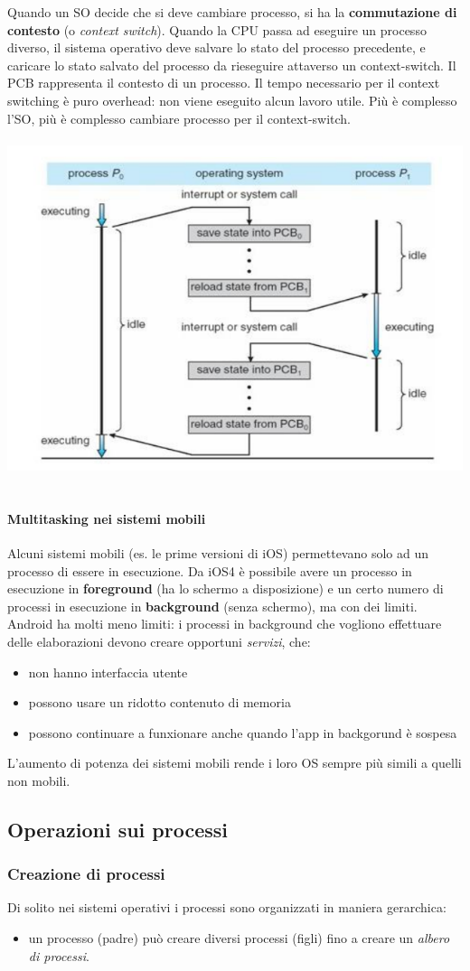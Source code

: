\documentclass[11pt]{article}
\begin{document}
Quando un SO decide che si deve cambiare processo, si ha la \textbf{commutazione di contesto} (o \textit{context switch}). Quando la CPU passa ad eseguire un processo diverso, il sistema operativo deve salvare lo stato del processo precedente, e caricare lo stato salvato del processo da rieseguire attaverso un context-switch.
Il PCB rappresenta il contesto di un processo. Il tempo necessario per il context switching è puro overhead: non viene eseguito alcun lavoro utile. Più è complesso l'SO, più è complesso cambiare processo per il context-switch.
\\ \\
\includegraphics[scale=0.7]{context-switching.png}
\\ \\ 
\paragraph{Multitasking nei sistemi mobili} Alcuni sistemi mobili (es. le prime versioni di iOS) permettevano solo ad un processo di essere in esecuzione. Da iOS4 è possibile avere un processo in esecuzione in \textbf{foreground} (ha lo schermo a disposizione) e un certo numero di processi in esecuzione in \textbf{background} (senza schermo), ma con dei limiti.
Android ha molti meno limiti: i processi in background che vogliono effettuare delle elaborazioni devono creare opportuni \textit{servizi}, che:
\begin{itemize}
\item non hanno interfaccia utente
\item possono usare un ridotto contenuto di memoria
\item possono continuare a funxionare anche quando l'app in backgorund è sospesa
\end{itemize}
L'aumento di potenza dei sistemi mobili rende i loro OS sempre più simili a quelli non mobili.

\subsection{Operazioni sui processi}
\subsubsection{Creazione di processi}
Di solito nei sistemi operativi i processi sono organizzati in maniera gerarchica:
\begin{itemize}
\item un processo (padre) può creare diversi processi (figli) fino a creare un \textit{albero di processi}.
\end{itemize}
\end{document}
